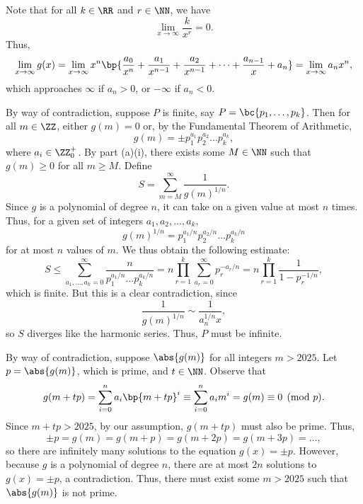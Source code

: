 \begin{solution}
    \begin{ppart}
        \begin{psubpart}
            Note that for all $k \in \RR$ and $r \in \NN$, we have \[\lim_{x \to \infty} \frac{k}{x^r} = 0.\] Thus, \[\lim_{x \to \infty} g(x) = \lim_{x \to \infty} x^n \bp{\frac{a_0}{x^n} + \frac{a_1}{x^{n-1}} + \frac{a_2}{x^{n-1}} + \dots + \frac{a_{n-1}}{x} + a_n} = \lim_{x \to \infty} a_n x^n,\] which approaches $\infty$ if $a_n > 0$, or $-\infty$ if $a_n < 0$.
        \end{psubpart}
        \begin{psubpart}
            By way of contradiction, suppose $P$ is finite, say $P = \bc{p_1, \dots, p_k}$. Then for all $m \in \ZZ$, either $g(m) = 0$ or, by the Fundamental Theorem of Arithmetic, \[g(m) = \pm p_1^{a_1} p_2^{a_2} \dots p_k^{a_k},\] where $a_i \in \ZZ_0^+$. By part (a)(i), there exists some $M \in \NN$ such that $g(m) \geq 0$ for all $m \geq M$. Define \[S = \sum_{m = M}^\infty \frac1{g(m)^{1/n}}.\] Since $g$ is a polynomial of degree $n$, it can take on a given value at most $n$ times. Thus, for a given set of integers $a_1, a_2, \dots, a_k$, \[g(m)^{1/n} = p_1^{a_1/n} p_2^{a_2/n} \dots p_k^{a_k/n}\] for at most $n$ values of $m$. We thus obtain the following estimate: \[S \leq \sum_{a_1, \dots, a_k = 0}^\infty \frac{n}{p_1^{a_1/n} \dots p_k^{a_k/n}} = n \prod_{r = 1}^k \sum_{a_r = 0}^\infty p_r^{-a_r/n} = n \prod_{r = 1}^k \frac{1}{1 - p_r^{-1/n}},\] which is finite. But this is a clear contradiction, since \[\frac1{g(m)^{1/n}} \sim \frac1{a_n^{1/n} x},\] so $S$ diverges like the harmonic series. Thus, $P$ must be infinite.
        \end{psubpart}
    \end{ppart}
    \begin{ppart}
        By way of contradiction, suppose $\abs{g(m)}$ for all integers $m > 2025$. Let $p = \abs{g(m)}$, which is prime, and $t \in \NN$. Observe that \[g(m + tp) = \sum_{i = 0}^n a_i \bp{m + tp}^i \equiv \sum_{i = 0}^n a_i m^i = g(m) \equiv 0 \pmod{p}.\] Since $m + tp > 2025$, by our assumption, $g(m+tp)$ must also be prime. Thus, \[\pm p = g(m) = g(m + p) = g(m + 2p) = g(m + 3p) = \dots,\] so there are infinitely many solutions to the equation $g(x) = \pm p$. However, because $g$ is a polynomial of degree $n$, there are at most $2n$ solutions to $g(x) = \pm p$, a contradiction. Thus, there must exist some $m > 2025$ such that $\abs{g(m)}$ is not prime.
    \end{ppart}
\end{solution}